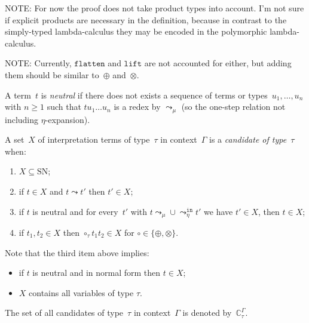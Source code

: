 \documentclass[runningheads,a4paper]{llncs}
\newcommand{\arretain}{\leadsto_\eta^{\mathtt{in}}}
\newcommand{\arrnormalise}{\leadsto}
\newcommand{\normstep}{\leadsto_\mu}
\newcommand{\flatten}{\mathtt{flatten}}
\newcommand{\lift}{\mathtt{lift}}
\newcommand{\SN}{\mathrm{SN}}
\newcommand{\Cb}{\mathbb{C}}
\begin{document}
NOTE: For now the proof does not take product types into account. I'm
not sure if explicit products are necessary in the definition, because
in contrast to the simply-typed lambda-calculus they may be encoded in
the polymorphic lambda-calculus.

NOTE: Currently, $\flatten$ and $\lift$ are not accounted for either,
but adding them should be similar to~$\oplus$ and~$\otimes$.

\begin{definition}\label{def_candidate}
  A term~$t$ is \emph{neutral} if there does not exists a sequence of
  terms or types~$u_1,\ldots,u_n$ with $n \ge 1$ such that $t u_1 \ldots
  u_n$ is a redex by $\normstep$ (so the one-step relation not including
  $\eta$-expansion).

  A set~$X$ of interpretation terms of type~$\tau$ in context~$\Gamma$
  is a \emph{candidate of type~$\tau$} when:
  \begin{enumerate}
  \item $X \subseteq \SN$;
  \item if $t \in X$ and $t \arrnormalise t'$ then $t' \in X$;
  \item if $t$ is neutral and for every~$t'$ with $t \normstep \cup
    \arretain t'$ we have $t' \in X$, then $t \in X$;
  \item if $t_1,t_2 \in X$ then $\circ_\tau t_1 t_2 \in X$ for $\circ
    \in \{\oplus,\otimes\}$.
  \end{enumerate}
  Note that the third item above implies:
  \begin{itemize}
  \item if $t$ is neutral and in normal form then $t \in X$;
  \item $X$ contains all variables of type $\tau$.
  \end{itemize}
  The set of all candidates of type~$\tau$ in context~$\Gamma$ is
  denoted by~$\Cb_\tau^\Gamma$.
\end{definition}
\end{document}
